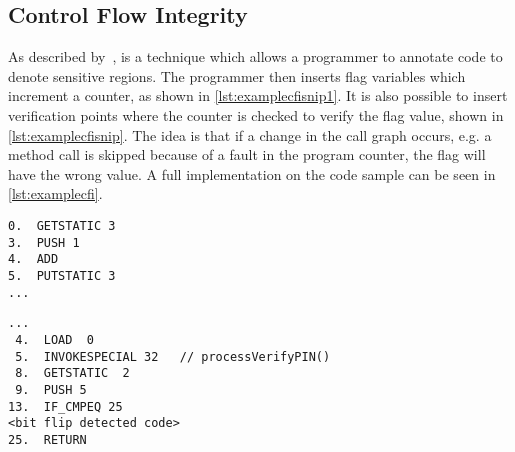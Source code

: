 \subsection{Control Flow Integrity} 
As described by~\cite{agl}, is a technique which allows a programmer to annotate code to denote sensitive regions. The programmer then inserts flag variables which increment a counter, as shown in \cref{lst:examplecfisnip1}. It is also possible to insert verification points where the counter is checked to verify the flag value, shown in \cref{lst:examplecfisnip}. The idea is that if a change in the call graph occurs, e.g. a method call is skipped because of a fault in the program counter, the flag will have the wrong value. A full implementation on the code sample can be seen in \cref{lst:examplecfi}.

\begin{lstlisting}[caption={Java code example of the control flow integrity countermeasure incrementing the control flow flag.},numbers=none,label={lst:examplecfisnip1}]
0.  GETSTATIC 3
3.  PUSH 1
4.  ADD
5.  PUTSTATIC 3
...
\end{lstlisting}

\begin{lstlisting}[caption={Java code example of the control flow integrity countermeasure checking the control flow flag.},numbers=none,label={lst:examplecfisnip}]
...
 4.  LOAD  0
 5.  INVOKESPECIAL 32   // processVerifyPIN()
 8.  GETSTATIC  2
 9.  PUSH 5
13.  IF_CMPEQ 25
<bit flip detected code>
25.  RETURN
\end{lstlisting}


